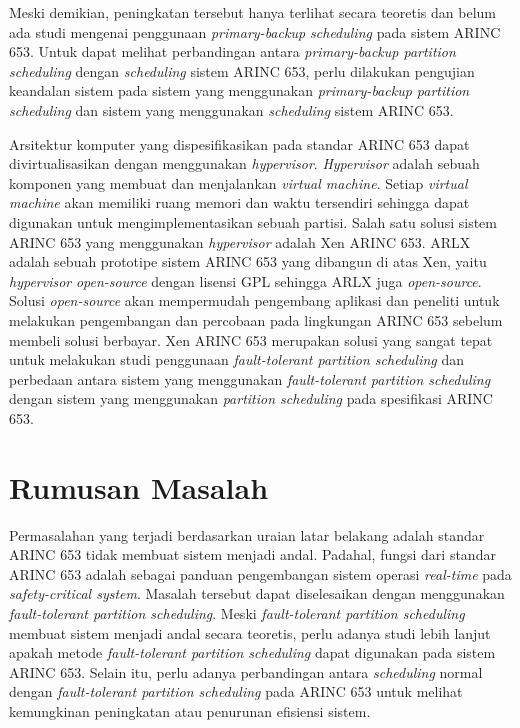 Meski demikian, peningkatan tersebut hanya terlihat secara teoretis dan belum ada studi mengenai
penggunaan \textit{primary-backup scheduling} pada sistem ARINC 653. Untuk dapat melihat
perbandingan antara \textit{primary-backup partition scheduling} dengan \textit{scheduling}
sistem ARINC 653, perlu dilakukan pengujian keandalan sistem pada sistem yang menggunakan
\textit{primary-backup partition scheduling} dan sistem yang menggunakan \textit{scheduling}
sistem ARINC 653.

Arsitektur komputer yang dispesifikasikan pada standar ARINC 653 dapat divirtualisasikan dengan
menggunakan \textit{hypervisor}. \textit{Hypervisor} adalah sebuah komponen yang membuat dan
menjalankan \textit{virtual machine}.  Setiap \textit{virtual machine} akan memiliki ruang
memori dan waktu tersendiri sehingga dapat digunakan untuk mengimplementasikan sebuah partisi.
Salah satu solusi sistem ARINC 653 yang menggunakan \textit{hypervisor} adalah Xen ARINC 653.
ARLX adalah sebuah prototipe sistem ARINC 653 yang dibangun di atas Xen, yaitu
\textit{hypervisor} \textit{open-source} dengan lisensi GPL sehingga ARLX juga
\textit{open-source}.  Solusi \textit{open-source} akan mempermudah pengembang aplikasi dan
peneliti untuk melakukan pengembangan dan percobaan pada lingkungan ARINC 653 sebelum membeli
solusi berbayar. Xen ARINC 653 merupakan solusi yang sangat tepat untuk melakukan studi
penggunaan \textit{fault-tolerant partition scheduling} dan perbedaan antara sistem yang
menggunakan \textit{fault-tolerant partition scheduling} dengan sistem yang menggunakan
\textit{partition scheduling} pada spesifikasi ARINC 653.

\section{Rumusan Masalah}

Permasalahan yang terjadi berdasarkan uraian latar belakang adalah standar ARINC 653 tidak
membuat sistem menjadi andal. Padahal, fungsi dari standar ARINC 653 adalah sebagai panduan
pengembangan sistem operasi \textit{real-time} pada \textit{safety-critical system}.  Masalah
tersebut dapat diselesaikan dengan menggunakan \textit{fault-tolerant partition scheduling}.
Meski \textit{fault-tolerant partition scheduling} membuat sistem menjadi andal secara teoretis,
perlu adanya studi lebih lanjut apakah metode \textit{fault-tolerant partition scheduling} dapat
digunakan pada sistem ARINC 653. Selain itu, perlu adanya perbandingan antara
\textit{scheduling} normal dengan \textit{fault-tolerant partition scheduling} pada ARINC 653
untuk melihat kemungkinan peningkatan atau penurunan efisiensi sistem.

